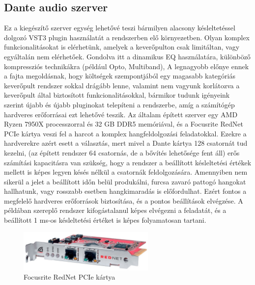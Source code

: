\subsection{Dante audio szerver}
Ez a kiegészítő szerver egység lehetővé teszi bármilyen alacsony késleltetéssel dolgozó VST3 plugin használatát a rendszerben elő környezetben.
Olyan komplex funkcionalitásokat is elérhetünk, amelyek a keverőpulton csak limitáltan, vagy egyáltalán nem elérhetőek.
Gondolva itt a dinamikus EQ használatára, különböző kompressziós technikákra (például Opto, Multiband), 
A legnagyobb előnye ennek a fajta megoldásnak, hogy költségek szempontjából egy magasabb kategóriás keverőpult rendszer sokkal drágább lenne,
valamint nem vagyunk korlátozva a keverőpult által biztosított funkcionalitásokkal, bármikor tudunk igényeink szerint újabb és újabb pluginokat
telepíteni a rendszerbe, amíg a számítógép hardveres erőforrásai ezt lehetővé teszik.
Az általam épített szerver egy AMD Ryzen 7950X processzorral és 32 GB DDR5 memóriával, és a Focusrite RedNet PCIe kártya veszi fel a harcot a
komplex hangfeldolgozási feladatokkal. Ezekre a hardverekre azért esett a választás, mert mivel a Dante kártya 128 csatornát tud kezelni, 
(az épített rendszer 64 csatornás, de a bővítés lehetősége fent áll) erős számítási kapacitásra van szükség, hogy a rendszer a beállított
késleltetési értékek mellett is képes legyen késés nélkül a csatornák feldolgozására. Amennyiben nem sikerül a jelet a beállított időn belül
produkálni, furcsa zavaró pattogó hangokat hallhatunk, vagy rosszabb esetben hangkimaradás is előfordulhat. Ezért fontos a megfelelő hardveres
erőforrások biztosítása, és a pontos beállítások elvégzése.
A példában szereplő rendszer kifogástalanul képes elvégezni a feladatát, és a beállított 1 ms-os késleltetési értéket is képes folyamatosan tartani.
\begin{figure}[H]
	\centering
	\includegraphics[width=67mm, keepaspectratio]{figures/rednet_pcie.jpg}
	\caption{Focusrite RedNet PCIe kártya}\label{fig:rednet_pcie}
\end{figure}

